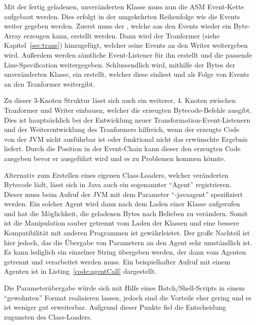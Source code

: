 Mit der fertig geladenen, unveränderten Klasse muss nun die ASM Event-Kette aufgebaut werden. Dies erfolgt in der umgekehrten Reihenfolge wie die Events weiter gegeben werden. Zuerst muss der , welche aus den Events wieder ein Byte-Array erzeugen kann, erstellt werden. Dann wird der Tranformer (siehe Kapitel~\ref{sec:trans}) hinzugefügt, welcher seine Events an den Writer weitergeben wird. Außerdem werden sämtliche Event-Listener für ihn erstellt und die passende Line-Specification weitergegeben. Schlussendlich wird, mithilfe der Bytes der unveränderten Klasse, ein  erstellt, welcher diese einliest und als Folge von Events an den Tranformer weitergibt.

Zu dieser 3-Knoten Struktur lässt sich auch ein weiterer, 4. Knoten zwischen Tranformer und Writer einbauen, welcher die erzeugten Bytecode-Befehle ausgibt. Dies ist hauptsächlich bei der Entwicklung neuer Transformation-Event-Listenern und der Weiterentwicklung des Tranformers hilfreich, wenn der erzeugte Code von der \ac{JVM} nicht ausführbar ist oder funktional nicht das erwünschte Ergebnis liefert. Durch die Position in der Event-Chain kann dieser den erzeugten Code ausgeben bevor er ausgeführt wird und es zu Problemen kommen könnte.

Alternativ zum Erstellen eines eigenen Class-Loaders, welcher veränderten Bytecode lädt, lässt sich in Java auch ein sogenannter "`Agent"' registrieren. Dieser muss beim Aufruf der \ac{JVM} mit dem Parameter "`-javaagent"' spezifiziert werden. Ein solcher Agent wird dann nach dem Laden einer Klasse aufgerufen und hat die Möglichkeit, die geladenen Bytes nach Belieben zu verändern. Somit ist die Manipulation sauber getrennt vom Laden der Klassen und eine bessere Kompatibilität mit anderen Programmen ist gewährleistet. Der große Nachteil ist hier jedoch, das die Übergabe von Parametern an den Agent sehr umständlich ist. Es kann lediglich ein einzelner String übergeben werden, der dann vom Agenten getrennt und verarbeitet werden muss. \cite{agent_arg_stack} Ein beispielhafter Aufruf mit einem Agenten ist in Listing~\ref{code:agentCall} dargestellt.

 

Die Parameterübergabe würde sich mit Hilfe eines Batch/Shell-Scripts in einem "`gewohnten"' Format realisieren lassen, jedoch sind die Vorteile eher gering und es ist weniger gut erweiterbar. Aufgrund dieser Punkte fiel die Entscheidung zugunsten des Class-Loaders.

